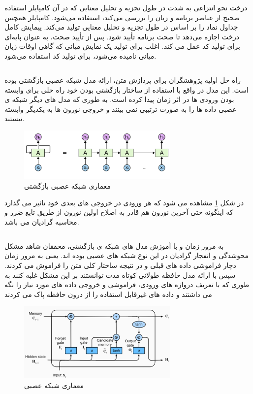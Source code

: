 درخت نحو انتزاعی به شدت در طول تجزیه و تحلیل معنایی که در آن کامپایلر استفاده صحیح از عناصر برنامه و زبان را بررسی می‌کند، استفاده می‌شود. کامپایلر همچنین جداول نماد را بر اساس   در طول تجزیه و تحلیل معنایی تولید می‌کند. پیمایش کامل درخت اجازه می‌دهد تا صحت برنامه تأیید شود.
پس از تأیید صحت،   به عنوان پایه‌ای برای تولید کد عمل می کند.   اغلب برای تولید یک نمایش میانی   که گاهی اوقات زبان میانی نامیده می‌شود، برای تولید کد استفاده می‌شود.
\cite{ast}
\subsection {}
راه حل اولیه پژوهشگران برای پردازش متن، ارائه مدل شبکه عصبی بازگشتی بوده است.  این مدل در واقع با
استفاده از ساختار بازگشتی بودن خود راه حلی برای وابسته بودن ورودی ها در اثر زمان پیدا کرده است. به طوری که
مدل های دیگر شبکه ی عصبی داده ها را به صورت ترتیبی نمی بینند و خروجی نورون ها به یکدیگر وابسته نیستند.
\begin{figure}[H]
	\centering
	\includegraphics[width=0.7\textwidth]{figures/RNN.png}
	\caption{معماری شبکه عصبی بازگشتی}
	\label{fig:RNN}
\end{figure}

در شکل \ref{fig:RNN} مشاهده می شود که هر ورودی در خروجی های بعدی خود تاثیر می گذارد که اینگونه حتی آخرین نورون
هم قادر به اصلاح اولین نورون از طریق تابع ضرر و محاسبه گرادیان می باشد.
\cite{SHERSTINSKY2020132306}
\subsection{}
به مرور زمان و با آموزش مدل های شبکه ی بازگشتی، محققان شاهد مشکل محوشدگی و انفجار گرادیان در این نوع
شبکه های عصبی بوده اند. یعنی به مرور زمان دچار فراموشی داده های قبلی و در نتیجه ساختار کلی متن را فراموش
می کردند.
سپس با ارائه مدل حافظه طولانی کوتاه مدت  توانستند بر این مشکل غلبه کنند به طوری که با تعریف دروازه های
ورودی، فراموشی و خروجی داده های مورد نیاز را نگه می داشتند و داده های غیرقابل استفاده را از درون حافظه پاک
می کردند

\begin{figure}[H]
	\centering
	\includegraphics[width=0.7\textwidth]{figures/LSTM.png}
	\caption{معماری شبکه عصبی }
	\label{fig:LSTM}
\end{figure}

